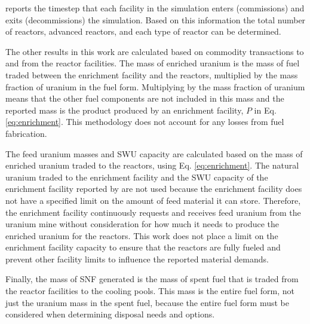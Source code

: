 \Cyclus reports the timestep that each facility in the simulation enters 
(commissions) and exits (decommissions) the simulation. Based on 
this information the total number of reactors, advanced reactors, and 
each type of reactor can be determined. 

The other results in this work are calculated based on commodity 
transactions to and from the reactor facilities. The mass of enriched 
uranium is the mass of fuel traded between the enrichment facility and 
the reactors, multiplied by the mass fraction of uranium in the fuel 
form. Multiplying by the mass fraction of uranium means that the other 
fuel components are not included in this mass and the reported mass is 
the product produced by an enrichment facility, $P$ in Eq. 
\ref{eq:enrichment}. This methodology does not account for any 
losses from fuel fabrication.

The feed uranium masses and \gls{SWU} capacity are calculated 
based on the mass of enriched uranium traded to the reactors, using 
Eq. \ref{eq:enrichment}. The natural uranium traded to the enrichment 
facility and the \gls{SWU} capacity of the enrichment facility reported 
by 
\Cyclus are not used because the enrichment facility does not have a 
specified limit on the amount of feed material it can store. Therefore, 
the enrichment facility continuously requests and receives feed 
uranium from the uranium mine without consideration for how much it needs 
to produce the enriched uranium for the reactors. This work does not 
place a limit on the enrichment facility capacity to ensure that the 
reactors are fully fueled and prevent other facility limits to 
influence the reported material demands. 

Finally, the mass of \gls{SNF} generated is the mass of spent fuel that is 
traded from the reactor facilities to the cooling pools. This mass is the 
entire fuel form, not just the uranium mass in the spent fuel, because 
the entire fuel form must be considered when determining disposal needs 
and options. 
